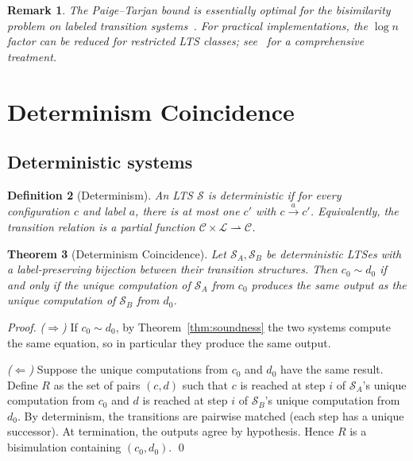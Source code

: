 \documentclass[twocolumn,11pt,a4paper]{article}
\newtheorem{theorem}{Theorem}[section]
\newtheorem{definition}[theorem]{Definition}
\newtheorem{remark}[theorem]{Remark}
\newcommand{\Conf}{\mathcal{C}}
\newcommand{\Lab}{\mathcal{L}}
\newcommand{\Sys}{\mathcal{S}}
\newcommand{\bisim}{\sim}
\begin{document}
\begin{remark}
The Paige--Tarjan bound is essentially optimal for the bisimilarity problem on labeled transition systems~\citep{paige1987three}. For practical implementations, the $\log n$ factor can be reduced for restricted LTS classes; see~\citet{kanellakis1990ccs} for a comprehensive treatment.
\end{remark}

\section{Determinism Coincidence}
\label{sec:determinism}

\subsection{Deterministic systems}

\begin{definition}[Determinism]
\label{def:determinism}
An LTS $\Sys$ is \emph{deterministic} if for every configuration $c$ and label $a$, there is at most one $c'$ with $c \xrightarrow{a} c'$. Equivalently, the transition relation is a partial function $\Conf \times \Lab \rightharpoonup \Conf$.
\end{definition}

\begin{theorem}[Determinism Coincidence]
\label{thm:det-coincide}
Let $\Sys_A, \Sys_B$ be deterministic LTSes with a label-preserving bijection between their transition structures. Then $c_0 \bisim d_0$ if and only if the unique computation of $\Sys_A$ from $c_0$ produces the same output as the unique computation of $\Sys_B$ from $d_0$.
\end{theorem}

\begin{proof}
\emph{($\Rightarrow$)} If $c_0 \bisim d_0$, by Theorem~\ref{thm:soundness} the two systems compute the same equation, so in particular they produce the same output.

\emph{($\Leftarrow$)} Suppose the unique computations from $c_0$ and $d_0$ have the same result. Define $R$ as the set of pairs $(c, d)$ such that $c$ is reached at step $i$ of $\Sys_A$'s unique computation from $c_0$ and $d$ is reached at step $i$ of $\Sys_B$'s unique computation from $d_0$. By determinism, the transitions are pairwise matched (each step has a unique successor). At termination, the outputs agree by hypothesis. Hence $R$ is a bisimulation containing $(c_0, d_0)$. \qed
\end{proof}
\end{document}
